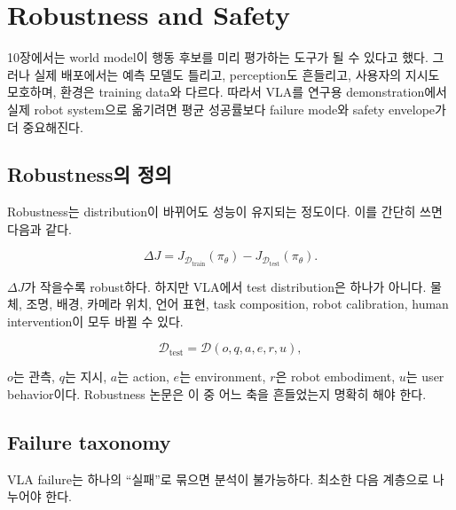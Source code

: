 \chapter{Robustness and Safety}
\label{ch:robustness_safety}

10장에서는 world model이 행동 후보를 미리 평가하는 도구가 될 수 있다고 했다. 그러나 실제 배포에서는 예측 모델도 틀리고, perception도 흔들리고, 사용자의 지시도 모호하며, 환경은 training data와 다르다. 따라서 VLA를 연구용 demonstration에서 실제 robot system으로 옮기려면 평균 성공률보다 failure mode와 safety envelope가 더 중요해진다.

\section{Robustness의 정의}

Robustness는 distribution이 바뀌어도 성능이 유지되는 정도이다. 이를 간단히 쓰면 다음과 같다.

\begin{equation}
  \Delta J
  =
  J_{\mathcal{D}_{\mathrm{train}}}(\pi_\theta)
  -
  J_{\mathcal{D}_{\mathrm{test}}}(\pi_\theta).
\end{equation}

$\Delta J$가 작을수록 robust하다. 하지만 VLA에서 test distribution은 하나가 아니다. 물체, 조명, 배경, 카메라 위치, 언어 표현, task composition, robot calibration, human intervention이 모두 바뀔 수 있다.

\begin{equation}
  \mathcal{D}_{\mathrm{test}}
  =
  \mathcal{D}
  (
    o,
    q,
    a,
    e,
    r,
    u
  ),
\end{equation}

$o$는 관측, $q$는 지시, $a$는 action, $e$는 environment, $r$은 robot embodiment, $u$는 user behavior이다. Robustness 논문은 이 중 어느 축을 흔들었는지 명확히 해야 한다.

\section{Failure taxonomy}

VLA failure는 하나의 ``실패''로 묶으면 분석이 불가능하다. 최소한 다음 계층으로 나누어야 한다.

